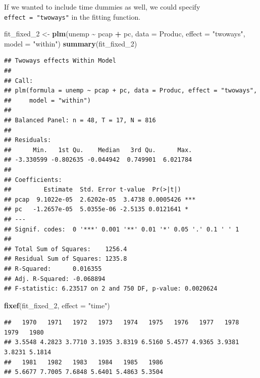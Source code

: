 \documentclass[
  12pt,
  oneside,openany]{book}
\newenvironment{Shaded}{\begin{snugshade}}{\end{snugshade}}
\newcommand{\DataTypeTok}[1]{\textcolor[rgb]{0.13,0.29,0.53}{#1}}
\newcommand{\DecValTok}[1]{\textcolor[rgb]{0.00,0.00,0.81}{#1}}
\newcommand{\KeywordTok}[1]{\textcolor[rgb]{0.13,0.29,0.53}{\textbf{#1}}}
\newcommand{\NormalTok}[1]{#1}
\newcommand{\OperatorTok}[1]{\textcolor[rgb]{0.81,0.36,0.00}{\textbf{#1}}}
\newcommand{\StringTok}[1]{\textcolor[rgb]{0.31,0.60,0.02}{#1}}
\begin{document}
If we wanted to include time dummies as well, we could specify \texttt{effect\ =\ "twoways"} in the fitting function.

\begin{Shaded}
\begin{Highlighting}[]
\NormalTok{fit\_fixed\_}\DecValTok{2}\NormalTok{ \textless{}{-}}\StringTok{ }\KeywordTok{plm}\NormalTok{(unemp }\OperatorTok{\textasciitilde{}}\StringTok{ }\NormalTok{pcap }\OperatorTok{+}\StringTok{ }\NormalTok{pc,}
                   \DataTypeTok{data =}\NormalTok{ Produc,}
                   \DataTypeTok{effect =} \StringTok{"twoways"}\NormalTok{,}
                   \DataTypeTok{model =} \StringTok{"within"}\NormalTok{)}
\KeywordTok{summary}\NormalTok{(fit\_fixed\_}\DecValTok{2}\NormalTok{)}
\end{Highlighting}
\end{Shaded}

\begin{verbatim}
## Twoways effects Within Model
## 
## Call:
## plm(formula = unemp ~ pcap + pc, data = Produc, effect = "twoways", 
##     model = "within")
## 
## Balanced Panel: n = 48, T = 17, N = 816
## 
## Residuals:
##      Min.   1st Qu.    Median   3rd Qu.      Max. 
## -3.330599 -0.802635 -0.044942  0.749901  6.021784 
## 
## Coefficients:
##         Estimate  Std. Error t-value  Pr(>|t|)    
## pcap  9.1022e-05  2.6202e-05  3.4738 0.0005426 ***
## pc   -1.2657e-05  5.0355e-06 -2.5135 0.0121641 *  
## ---
## Signif. codes:  0 '***' 0.001 '**' 0.01 '*' 0.05 '.' 0.1 ' ' 1
## 
## Total Sum of Squares:    1256.4
## Residual Sum of Squares: 1235.8
## R-Squared:      0.016355
## Adj. R-Squared: -0.068894
## F-statistic: 6.23517 on 2 and 750 DF, p-value: 0.0020624
\end{verbatim}

\begin{Shaded}
\begin{Highlighting}[]
\KeywordTok{fixef}\NormalTok{(fit\_fixed\_}\DecValTok{2}\NormalTok{, }\DataTypeTok{effect =} \StringTok{"time"}\NormalTok{)}
\end{Highlighting}
\end{Shaded}

\begin{verbatim}
##   1970   1971   1972   1973   1974   1975   1976   1977   1978   1979   1980 
## 3.5548 4.2823 3.7710 3.1935 3.8319 6.5160 5.4577 4.9365 3.9381 3.8231 5.1814 
##   1981   1982   1983   1984   1985   1986 
## 5.6677 7.7005 7.6848 5.6401 5.4863 5.3504
\end{verbatim}
\end{document}
